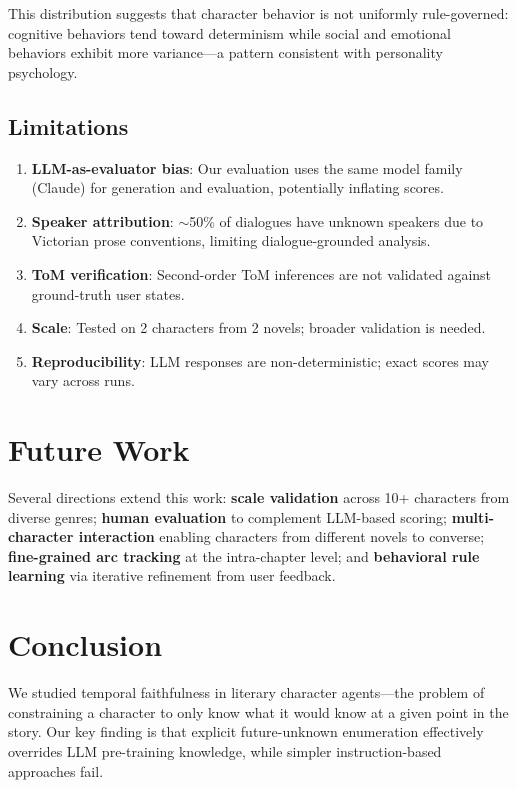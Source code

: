 \documentclass[11pt,a4paper]{article}
\begin{document}
This distribution suggests that character behavior is not uniformly rule-governed: cognitive behaviors tend toward determinism while social and emotional behaviors exhibit more variance---a pattern consistent with personality psychology.

\subsection{Limitations}
\label{sec:limitations}

\begin{enumerate}
\setlength\itemsep{0pt}
\item \textbf{LLM-as-evaluator bias}: Our evaluation uses the same model family (Claude) for generation and evaluation, potentially inflating scores.
\item \textbf{Speaker attribution}: $\sim$50\% of dialogues have unknown speakers due to Victorian prose conventions, limiting dialogue-grounded analysis.
\item \textbf{ToM verification}: Second-order ToM inferences are not validated against ground-truth user states.
\item \textbf{Scale}: Tested on 2 characters from 2 novels; broader validation is needed.
\item \textbf{Reproducibility}: LLM responses are non-deterministic; exact scores may vary across runs.
\end{enumerate}

\section{Future Work}
\label{sec:future}

Several directions extend this work:
\textbf{scale validation} across 10+ characters from diverse genres;
\textbf{human evaluation} to complement LLM-based scoring;
\textbf{multi-character interaction} enabling characters from different novels to converse;
\textbf{fine-grained arc tracking} at the intra-chapter level; and
\textbf{behavioral rule learning} via iterative refinement from user feedback.

\section{Conclusion}
\label{sec:conclusion}

We studied temporal faithfulness in literary character agents---the problem of constraining a character to only know what it would know at a given point in the story.
Our key finding is that explicit future-unknown enumeration effectively overrides LLM pre-training knowledge, while simpler instruction-based approaches fail.
\end{document}
